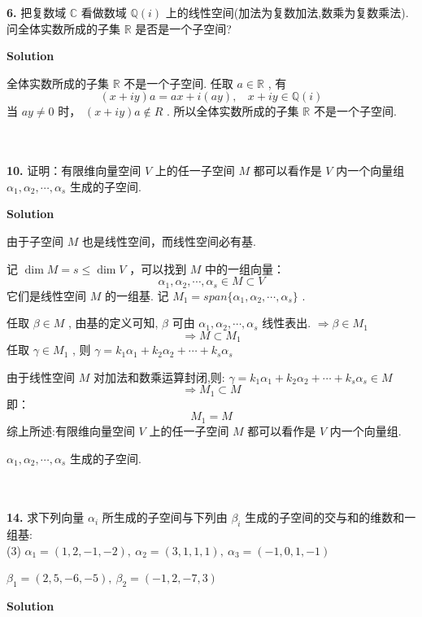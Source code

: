 \documentclass[11pt,a4paper,openany,oneside]{book}
\newcommand\Solution{\noindent\textbf{\textsf{Solution}}\par\medskip}
\begin{document}
\begin{myexample}
	\textbf{6.} 
把复数域 $ \mathbb{C} $ 看做数域 $ \mathbb{Q}(i) $ 上的线性空间(加法为复数加法,数乘为复数乘法). 问全体实数所成的子集 $ \mathbb{R} $ 是否是一个子空间?  \\  

\end{myexample}
\Solution 

全体实数所成的子集 $ \mathbb{R} $ 不是一个子空间. 任取 $ a \in \mathbb{R} $ , 有
 $$  (x+iy)a = ax + i(ay), \ \ \ \ x+iy \in \mathbb{Q}(i)   $$ 
当 $ ay \neq 0 $ 时， $ (x+iy)a \notin R $ . 所以全体实数所成的子集 $ \mathbb{R} $ 不是一个子空间.  \\  \\  \\ 

\begin{myexample}
	\textbf{10.} 
证明：有限维向量空间 $ V $ 上的任一子空间 $ M $ 都可以看作是 $ V $ 内一个向量组 $ \alpha_1, \alpha_2, \cdots, \alpha_s $ 生成的子空间.  \\

\end{myexample}
\Solution

由于子空间 $ M $ 也是线性空间，而线性空间必有基.

记 $ \dim   M = s \leq \dim V $ ，可以找到 $ M $ 中的一组向量：
 $$  \alpha_1, \alpha_2, \cdots, \alpha_s  \in M \subset V $$ 
它们是线性空间 $ M $ 的一组基. 记 $ M_1 = span\{\alpha_1, \alpha_2, \cdots, \alpha_s \} $ .

任取 $ \beta \in M $ , 由基的定义可知,  $ \beta $ 可由 $ \alpha_1, \alpha_2, \cdots, \alpha_s $ 线性表出.  $ \Rightarrow \beta \in M_1  $  
 $$  \Rightarrow M \subset M_1  $$ 
任取 $ \gamma \in M_1 $ , 则 $ \gamma = k_1\alpha_1 + k_2\alpha_2 + \cdots + k_s\alpha_s  $ 

由于线性空间 $ M $ 对加法和数乘运算封闭,则:  $  \gamma = k_1\alpha_1 + k_2\alpha_2 + \cdots + k_s\alpha_s \in M  $ 
 $$  \Rightarrow M_1 \subset M   $$ 
即：
 $$  M_1 = M  $$ 
综上所述:有限维向量空间 $ V $ 上的任一子空间 $ M $ 都可以看作是 $ V $ 内一个向量组.

 $ \alpha_1, \alpha_2, \cdots, \alpha_s $ 生成的子空间. \\  \\   \\

\begin{myexample}
	\textbf{14.} 
求下列向量 $ \alpha_i $ 所生成的子空间与下列由 $ \beta_i $ 生成的子空间的交与和的维数和一组基: \\
(3)  $ \alpha_1 = (1, 2, -1, -2), \ \alpha_2 = (3, 1, 1, 1), \ \alpha_3 = (-1, 0, 1, -1) $  

\hspace{1em}  $ \beta_1 = (2, 5, -6, -5), \ \beta_2 = (-1, 2, -7, 3) $  \\

\end{myexample}
\Solution 
\end{document}
